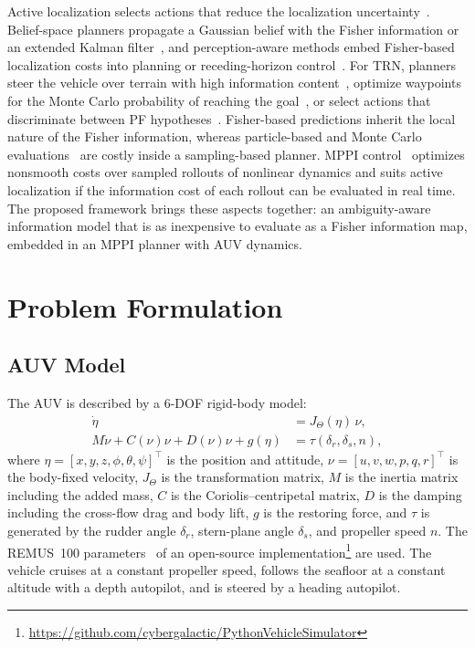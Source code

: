 \documentclass[letterpaper, 10 pt, journal, twoside]{IEEEtran}
\begin{document}
Active localization selects actions that reduce the localization uncertainty~\cite{fox1998active}. Belief-space planners propagate a Gaussian belief with the Fisher information or an extended Kalman filter~\cite{prentice2009belief, vandenberg2011lqg, bry2011rapidly, indelman2015planning}, and perception-aware methods embed Fisher-based localization costs into planning or receding-horizon control~\cite{zhang2019beyond, falanga2018pampc}. For TRN, planners steer the vehicle over terrain with high information content~\cite{hausler2013cooperative}, optimize waypoints for the Monte Carlo probability of reaching the goal~\cite{krukowski2016waypoint}, or select actions that discriminate between PF hypotheses~\cite{fairfield2008active}. Fisher-based predictions inherit the local nature of the Fisher information, whereas particle-based and Monte Carlo evaluations~\cite{hoffmann2010mobile, ryan2010particle, krukowski2016waypoint} are costly inside a sampling-based planner. MPPI control~\cite{williams2016aggressive, williams2017model, williams2018information} optimizes nonsmooth costs over sampled rollouts of nonlinear dynamics and suits active localization if the information cost of each rollout can be evaluated in real time. The proposed framework brings these aspects together: an ambiguity-aware information model that is as inexpensive to evaluate as a Fisher information map, embedded in an MPPI planner with AUV dynamics.

\section{Problem Formulation}
\label{sec:problem}

\subsection{AUV Model}
The AUV is described by a 6-DOF rigid-body model:
\begin{align}
  \dot{\eta} &= J_\Theta(\eta)\,\nu, \label{eq:kinematics} \\
  M\dot{\nu} + C(\nu)\nu + D(\nu)\nu + g(\eta) &= \tau(\delta_r, \delta_s, n), \label{eq:kinetics}
\end{align}
where $\eta = [x, y, z, \phi, \theta, \psi]^\top$ is the position and attitude, $\nu = [u, v, w, p, q, r]^\top$ is the body-fixed velocity, $J_\Theta$ is the transformation matrix, $M$ is the inertia matrix including the added mass, $C$ is the Coriolis--centripetal matrix, $D$ is the damping including the cross-flow drag and body lift, $g$ is the restoring force, and $\tau$ is generated by the rudder angle $\delta_r$, stern-plane angle $\delta_s$, and propeller speed $n$. The REMUS~100 parameters~\cite{allen2000propulsion} of an open-source implementation\footnote{\url{https://github.com/cybergalactic/PythonVehicleSimulator}} are used. The vehicle cruises at a constant propeller speed, follows the seafloor at a constant altitude with a depth autopilot, and is steered by a heading autopilot.
\end{document}
